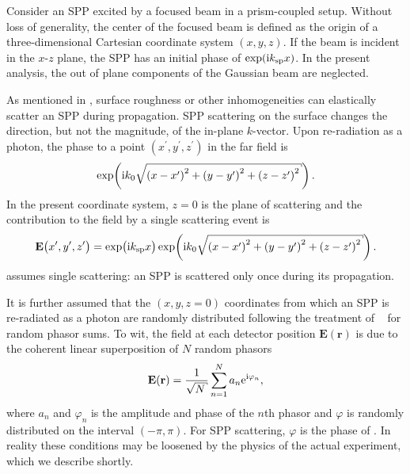 Consider an SPP excited by a focused beam in a prism-coupled setup.  Without
loss of generality, the center of the focused beam is defined as the origin
of a three-dimensional Cartesian coordinate system $(x,y,z)$.  If the beam is
incident in the $x$-$z$ plane, the SPP has an initial phase of $\exp({\mathrm{i}} k_\mathrm{sp}
x)$.  In the present analysis, the out of plane components of the Gaussian
beam are neglected.

As mentioned in , surface roughness or other
inhomogeneities can elastically scatter an SPP during propagation.  SPP
scattering on the surface changes the direction, but not the magnitude, of the
in-plane $k$-vector.  Upon re-radiation as a photon, the phase to a point
$(x^\prime,y^\prime,z^\prime)$ in the far field is
\begin{equation}
\exp\!\left(\mi k_0 \sqrt{{(x-x^\prime)}^2 + {(y-y^\prime)}^2 + {(z-z^\prime)}^2}\right).
\end{equation}
In the present coordinate system, $z=0$ is the plane of scattering and the
contribution to the field by a single scattering event is
\begin{equation}
\mathbf{E}\big(x^\prime,y^\prime,z^\prime\big)=\exp\!\big( \mi \ksp x \big)
\exp\!\left(\mi k_0 \sqrt{{(x-x^\prime)}^2 + {(y-y^\prime)}^2 + {(z-z^\prime)}^2}\right).
\label{eqn:sppsinglescattering}
\end{equation}
 assumes single scattering: an
SPP is scattered only once during its propagation.

It is further assumed that the $(x,y,z=0)$ coordinates from which an SPP is
re-radiated as a photon are randomly distributed following the treatment of
~\cite{goodman2007speckle} for random phasor sums.  To wit, the
field at each detector position $\mathbf{E}(\mathbf{r})$ is due to the
coherent linear superposition of $N$ random phasors
\begin{equation}
\mathbf{E}(\mathbf{r}) = \frac{1}{\sqrt{N}} \sum_{n=1}^{N} a_n \me^{\mi \varphi_n},
\label{eqn:phasorsum}
\end{equation}
where $a_n$ and $\varphi_n$ is the amplitude and phase of the $n$th phasor
and $\varphi$ is randomly distributed on the interval $(-\pi,\pi)$.  For
SPP scattering, $\varphi$ is the phase of .
In reality these conditions may be loosened by the physics of the actual
experiment, which we describe shortly.


